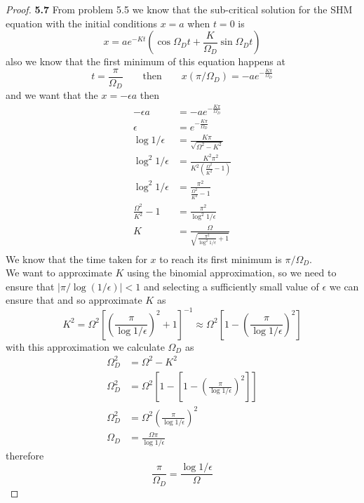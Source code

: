 \documentclass[11pt]{article}
\theoremstyle{definition}
\begin{document}
	\begin{proof}{\textbf{5.7}}
        From problem 5.5 we know that the sub-critical solution for the SHM
        equation with the initial conditions $x=a$ when $t=0$ is
        $$x = ae^{-Kt}\left(\cos{\Omega_D t} + \frac{K}{\Omega_D}\sin{\Omega_D t}\right)$$
        also we know that the first minimum of this equation happens at 
        $$t = \frac{\pi}{\Omega_D} \quad\quad\text{then}\quad\quad 
            x(\pi/\Omega_D) = -ae^{-\frac{K\pi}{\Omega_D}}$$
        and we want that the $x = -\epsilon a$ then
        \begin{align*}
            -\epsilon a &= -ae^{-\frac{K\pi}{\Omega_D}} \\
               \epsilon &= e^{-\frac{K\pi}{\Omega_D}} \\
            \log{1/\epsilon} &= \frac{K\pi}{\sqrt{\Omega^2 - K^2}} \\
            \log^2{1/\epsilon} &= \frac{K^2\pi^2}{K^2(\frac{\Omega^2}{K^2} - 1)} \\
            \log^2{1/\epsilon} &= \frac{\pi^2}{\frac{\Omega^2}{K^2} - 1} \\
            \frac{\Omega^2}{K^2} - 1 &= \frac{\pi^2}{\log^2{1/\epsilon}} \\
            K &= \frac{\Omega}{\sqrt{\frac{\pi^2}{\log^2{1/\epsilon}} + 1}}    \\
        \end{align*}
        We know that the time taken for $x$ to reach its ﬁrst minimum is
        $\pi/\Omega_D$.\\
        We want to approximate $K$ using the binomial approximation, so we
        need to ensure that $|\pi/\log(1/\epsilon)| < 1$ and selecting a
        sufficiently small value of $\epsilon$ we can ensure that and so
        approximate $K$ as
        $$K^2 = \Omega^2\left[\left(\frac{\pi}{\log{1/\epsilon}}\right)^2 + 1\right]^{-1}
            \approx \Omega^2\left[1 - \left(\frac{\pi}{\log{1/\epsilon}}\right)^2\right]$$
        with this approximation we calculate $\Omega_D$ as 
        \begin{align*}
            \Omega_D^2 &= \Omega^2 - K^2 \\
            \Omega_D^2 &= \Omega^2\left[1 - \left[1 - 
            \left(\frac{\pi}{\log{1/\epsilon}}\right)^2\right]\right]\\
            \Omega_D^2 &= \Omega^2\left(\frac{\pi}{\log{1/\epsilon}}\right)^2\\
            \Omega_D &= \frac{\Omega\pi}{\log{1/\epsilon}}
        \end{align*}
        therefore
        $$\frac{\pi}{\Omega_D} = \frac{\log{1/\epsilon}}{\Omega}$$
    \end{proof}
\end{document}
